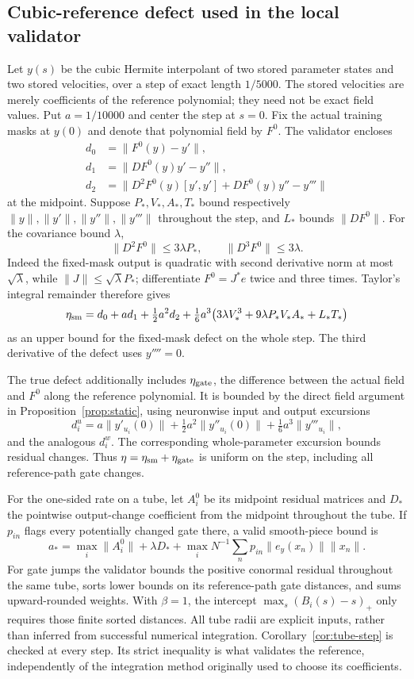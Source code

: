 \subsection{Cubic-reference defect used in the local validator}
Let $y(s)$ be the cubic Hermite interpolant of two stored parameter states
and two stored velocities, over a step of exact length $1/5000$.
The stored velocities are merely coefficients of the reference polynomial;
they need not be exact field values. Put $a=1/10000$ and center the step
at $s=0$. Fix the actual training masks at $y(0)$ and denote that polynomial
field by $F^0$. The validator encloses
\begin{align*}
 d_0&=\|F^0(y)-y'\|,\\
 d_1&=\|DF^0(y)y'-y''\|,\\
 d_2&=\|D^2F^0(y)[y',y']+DF^0(y)y''-y'''\|
\end{align*}
at the midpoint. Suppose $P_*,V_*,A_*,T_*$ bound respectively
$\|y\|,\|y'\|,\|y''\|,\|y'''\|$ throughout the step, and $L_*$
bounds $\|DF^0\|$. For the covariance bound $\lambda$,
\[
 \|D^2F^0\|\le3\lambda P_*,\qquad
 \|D^3F^0\|\le3\lambda.
\]
Indeed the fixed-mask output is quadratic with second derivative norm
at most $\sqrt\lambda$, while $\|J\|\le\sqrt\lambda P_*$;
differentiate $F^0=J^*e$ twice and three times.
Taylor's integral remainder therefore gives
\[
 \eta_{\rm sm}=d_0+ad_1+\tfrac12a^2d_2+
 \tfrac16a^3\big(3\lambda V_*^3+9\lambda P_*V_*A_*+L_*T_*\big)
\]
as an upper bound for the fixed-mask defect on the whole step.
The third derivative of the defect uses $y''''=0$.

The true defect additionally includes $\eta_{\rm gate}$, the difference
between the actual field and $F^0$ along the reference polynomial.
It is bounded by the direct field argument in
Proposition~\ref{prop:static}, using neuronwise input and output excursions
\[
 d_i^u=a\|y'_{u_i}(0)\|+\tfrac12a^2\|y''_{u_i}(0)\|
                    +\tfrac16a^3\|y'''_{u_i}\|,
\]
and the analogous $d_i^w$. The corresponding whole-parameter excursion
bounds residual changes. Thus $\eta=\eta_{\rm sm}+\eta_{\rm gate}$ is
uniform on the step, including all reference-path gate changes.

For the one-sided rate on a tube, let $A_i^0$ be its midpoint residual
matrices and $D_*$ the pointwise output-change coefficient from the midpoint
throughout the tube. If $p_{in}$ flags every potentially changed gate there,
a valid smooth-piece bound is
\[
 a_* = \max_i\|A_i^0\|+\lambda D_*
       +\max_i N^{-1}\sum_n p_{in}\|e_y(x_n)\|\|x_n\|.
\]
For gate jumps the validator bounds the positive conormal residual throughout
the same tube, sorts lower bounds on its reference-path gate distances,
and sums upward-rounded weights. With $\beta=1$, the intercept
$\max_s(B_i(s)-s)_+$ only requires those finite sorted distances.
All tube radii are explicit inputs, rather than inferred from successful
numerical integration. Corollary~\ref{cor:tube-step} is checked at every
step. Its strict inequality is what validates the reference, independently
of the integration method originally used to choose its coefficients.
